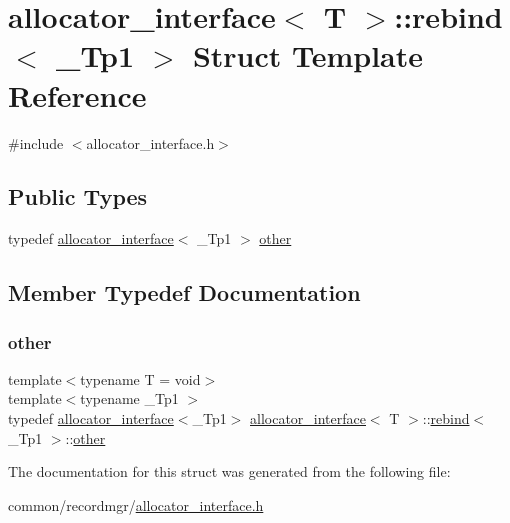\hypertarget{structallocator__interface_1_1rebind}{}\section{allocator\+\_\+interface$<$ T $>$\+:\+:rebind$<$ \+\_\+\+Tp1 $>$ Struct Template Reference}
\label{structallocator__interface_1_1rebind}


{\ttfamily \#include $<$allocator\+\_\+interface.\+h$>$}

\subsection*{Public Types}
\begin{DoxyCompactItemize}
\item 
typedef \hyperlink{classallocator__interface}{allocator\+\_\+interface}$<$ \+\_\+\+Tp1 $>$ \hyperlink{structallocator__interface_1_1rebind_ac338e0e51dd9aae6652fe51e9ffc366e}{other}
\end{DoxyCompactItemize}


\subsection{Member Typedef Documentation}
\mbox{\label{structallocator__interface_1_1rebind_ac338e0e51dd9aae6652fe51e9ffc366e}} 
\subsubsection{\texorpdfstring{other}{other}}
{\footnotesize\ttfamily template$<$typename T  = void$>$ \\
template$<$typename \+\_\+\+Tp1 $>$ \\
typedef \hyperlink{classallocator__interface}{allocator\+\_\+interface}$<$\+\_\+\+Tp1$>$ \hyperlink{classallocator__interface}{allocator\+\_\+interface}$<$ T $>$\+::\hyperlink{structallocator__interface_1_1rebind}{rebind}$<$ \+\_\+\+Tp1 $>$\+::\hyperlink{structallocator__interface_1_1rebind_ac338e0e51dd9aae6652fe51e9ffc366e}{other}}



The documentation for this struct was generated from the following file\+:\begin{DoxyCompactItemize}
\item 
common/recordmgr/\hyperlink{allocator__interface_8h}{allocator\+\_\+interface.\+h}\end{DoxyCompactItemize}
